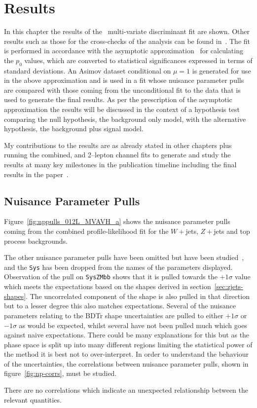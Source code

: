 \chapter{Results}%
\label{ch:results}
In this chapter the results of the \VHbb\ multi-variate discriminant fit are
shown. Other results such as those for the cross-checks of the analysis can be
found in~\cite{VHMainNote2019}. The fit is performed in accordance with the
asymptotic approximation~\cite{Cowan:2010js} for calculating the $p_0$ values,
which are converted to statistical significances expressed in terms of standard
deviations. An Asimov dataset conditional on $\mu=1$  is generated for use in
the above approximation and is used in a fit whose nuisance parameter pulls are
compared with those coming from the unconditional fit to the data that is used
to generate the final results. As per the prescription of the asymptotic
approximation the results will be discussed in the context of a hypothesis test
comparing the null hypothesis, the background only model, with the alternative
hypothesis, the background plus signal model.

My contributions to the results are as already stated in other chapters plus
running the combined, and 2--lepton channel fits to generate and study the
results at many key milestones in the publication timeline including the final
results in the paper~\cite{final-paper}.

\section{Nuisance Parameter Pulls}
Figure~\ref{fig:nppulls_012L_MVAVH_a} shows the nuisance parameter pulls coming
from the combined profile-likelihood fit for the $W+$jets, $Z+$jets and top
process backgrounds.

The other nuisance parameter pulls have been omitted but have been
studied~\cite{VHMainNote2019}, and the \texttt{Sys} has been dropped from the
names of the parameters displayed. Observation of the pull on \texttt{SysZMbb}
shows that it is pulled towards the $+1\sigma$ value which meets the
expectations based on the shapes derived in section~\ref{sec:zjets-shapes}. The
uncorrelated component of the shape is also pulled in that direction but to a
lesser degree this also matches expectations. Several of the nuisance parameters
relating to the BDTr shape uncertainties are pulled to either $+1\sigma$ or
$-1\sigma$ as would be expected, whilst several have not been pulled much which
goes against naive expectations. There could be many explanations for this but
as the phase space is split up into many different regions limiting the
statistical power of the method it is best not to over-interpret. In order to
understand the behaviour of the uncertainties, the correlations between nuisance
parameter pulls, shown in figure~\ref{fig:np-corrs}, must be studied.

There are no correlations which indicate an unexpected relationship between the
relevant quantities.

